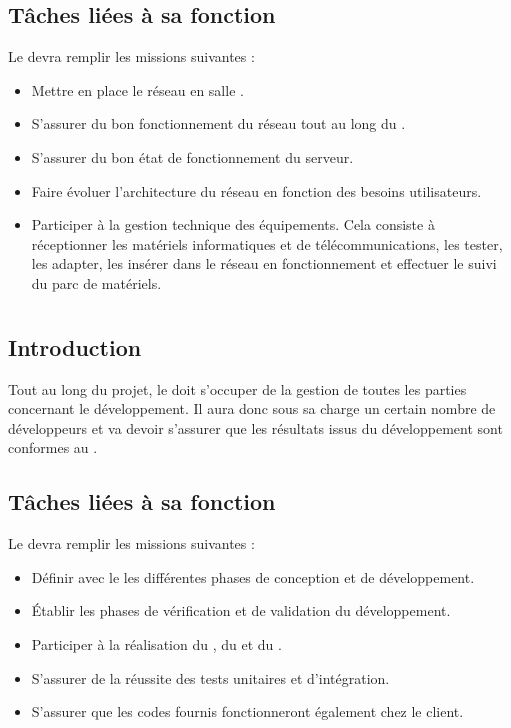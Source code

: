 \subsection*{Tâches liées à sa fonction}

Le \RRS devra remplir les missions suivantes :
\begin{itemize}
	\item Mettre en place le réseau en salle \PICCourt.
	\item S'assurer du bon fonctionnement du réseau tout au long du \PICCourt.
	\item S'assurer du bon état de fonctionnement du serveur.
	\item Faire évoluer l'architecture du réseau en fonction des besoins utilisateurs.
	\item Participer à la gestion technique des équipements. Cela consiste à réceptionner les matériels informatiques et de télécommunications, les tester, les adapter, les insérer dans le réseau en fonctionnement et effectuer le suivi du parc de matériels.
\end{itemize}

\newpage
\section{\RD}
\subsection*{Introduction}

Tout au long du projet, le \RD doit s'occuper de la gestion de toutes les parties concernant le développement. Il aura donc sous sa charge un certain nombre de développeurs et va devoir s'assurer que les résultats issus du développement sont conformes au \DGQDEUXCourt.

\subsection*{Tâches liées à sa fonction}

Le \RD devra remplir les missions suivantes :
\begin{itemize}
	\item Définir avec le \CP les différentes phases de conception et de développement.
	\item Établir les phases de vérification et de validation du développement.
	\item Participer à la réalisation du \DSECourt, du \DSICourt et du \PTVCourt.
	\item S'assurer de la réussite des tests unitaires et d'intégration.
	\item S'assurer que les codes fournis fonctionneront également chez le client.
\end{itemize}
